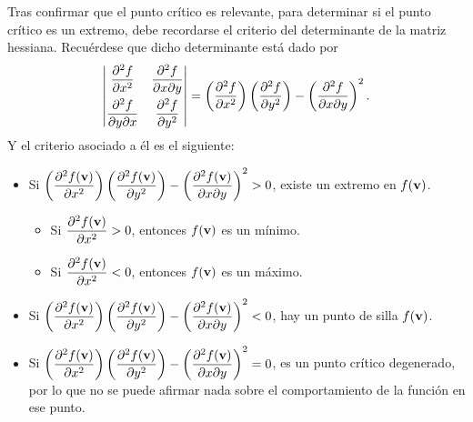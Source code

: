 \documentclass{fmbvecto}
\begin{document}
\begin{problema}[optimización]
    Tras confirmar que el punto crítico es relevante, para determinar si el punto crítico es un extremo, debe recordarse el criterio del determinante de la matriz hessiana. Recuérdese que dicho determinante está dado por
    \begin{equation*}
        \begin{vmatrix}
            \dnparder{2}[f][x] & \dfrac{\partial^2 f}{\partial x \partial y} \\[2ex]
            \dfrac{\partial^2 f}{\partial y \partial x} & \dnparder{2}[f][y]
        \end{vmatrix} = \left(\nparder{2}[f][x]\right)\left(\nparder{2}[f][y]\right) - \left(\frac{\partial^2 f}{\partial x \partial y}\right)^2.
    \end{equation*}
    Y el criterio asociado a él es el siguiente:
    \begin{itemize}
        \item Si \(\displaystyle \left(\nparder{2}[f(\bvec{v})][x]\right)\left(\nparder{2}[f(\bvec{v})][y]\right) - \left(\frac{\partial^2 f(\bvec{v})}{\partial x \partial y}\right)^2 >0 \), existe un extremo en \(f(\boldsymbol{{\mathbf{v}}})\).
        \begin{itemize}
        \item Si \(\displaystyle \nparder{2}[f(\bvec{v})][x] > 0 \), entonces \(f(\boldsymbol{{\mathbf{v}}})\) es un mínimo.
        \item Si \(\displaystyle \nparder{2}[f(\bvec{v})][x] < 0 \), entonces \(f(\boldsymbol{{\mathbf{v}}})\) es un máximo. 
        \end{itemize}
        \item  Si \(\displaystyle \left(\nparder{2}[f(\bvec{v})][x]\right)\left(\nparder{2}[f(\bvec{v})][y]\right) - \left(\frac{\partial^2 f(\bvec{v})}{\partial x \partial y}\right)^2 <0 \), hay un punto de silla \(f(\boldsymbol{{\mathbf{v}}})\).
        \item  Si \(\displaystyle \left(\nparder{2}[f(\bvec{v})][x]\right)\left(\nparder{2}[f(\bvec{v})][y]\right) - \left(\frac{\partial^2 f(\bvec{v})}{\partial x \partial y}\right)^2 = 0 \), es un punto crítico degenerado, por lo que no se puede afirmar nada sobre el comportamiento de la función en ese punto.\\
    \end{itemize}
    

\end{problema}
\end{document}
